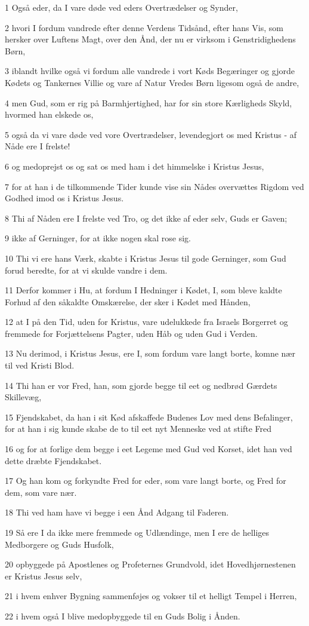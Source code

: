 \par 1 Også eder, da I vare døde ved eders Overtrædelser og Synder,
\par 2 hvori I fordum vandrede efter denne Verdens Tidsånd, efter hans Vis, som hersker over Luftens Magt, over den Ånd, der nu er virksom i Genstridighedens Børn,
\par 3 iblandt hvilke også vi fordum alle vandrede i vort Køds Begæringer og gjorde Kødets og Tankernes Villie og vare af Natur Vredes Børn ligesom også de andre,
\par 4 men Gud, som er rig på Barmhjertighed, har for sin store Kærligheds Skyld, hvormed han elskede os,
\par 5 også da vi vare døde ved vore Overtrædelser, levendegjort os med Kristus - af Nåde ere I frelste!
\par 6 og medoprejst os og sat os med ham i det himmelske i Kristus Jesus,
\par 7 for at han i de tilkommende Tider kunde vise sin Nådes overvættes Rigdom ved Godhed imod os i Kristus Jesus.
\par 8 Thi af Nåden ere I frelste ved Tro, og det ikke af eder selv, Guds er Gaven;
\par 9 ikke af Gerninger, for at ikke nogen skal rose sig.
\par 10 Thi vi ere hans Værk, skabte i Kristus Jesus til gode Gerninger, som Gud forud beredte, for at vi skulde vandre i dem.
\par 11 Derfor kommer i Hu, at fordum I Hedninger i Kødet, I, som bleve kaldte Forhud af den såkaldte Omskærelse, der sker i Kødet med Hånden,
\par 12 at I på den Tid, uden for Kristus, vare udelukkede fra Israels Borgerret og fremmede for Forjættelsens Pagter, uden Håb og uden Gud i Verden.
\par 13 Nu derimod, i Kristus Jesus, ere I, som fordum vare langt borte, komne nær til ved Kristi Blod.
\par 14 Thi han er vor Fred, han, som gjorde begge til eet og nedbrød Gærdets Skillevæg,
\par 15 Fjendskabet, da han i sit Kød afskaffede Budenes Lov med dens Befalinger, for at han i sig kunde skabe de to til eet nyt Menneske ved at stifte Fred
\par 16 og for at forlige dem begge i eet Legeme med Gud ved Korset, idet han ved dette dræbte Fjendskabet.
\par 17 Og han kom og forkyndte Fred for eder, som vare langt borte, og Fred for dem, som vare nær.
\par 18 Thi ved ham have vi begge i een Ånd Adgang til Faderen.
\par 19 Så ere I da ikke mere fremmede og Udlændinge, men I ere de helliges Medborgere og Guds Husfolk,
\par 20 opbyggede på Apostlenes og Profeternes Grundvold, idet Hovedhjørnestenen er Kristus Jesus selv,
\par 21 i hvem enhver Bygning sammenføjes og vokser til et helligt Tempel i Herren,
\par 22 i hvem også I blive medopbyggede til en Guds Bolig i Ånden.

